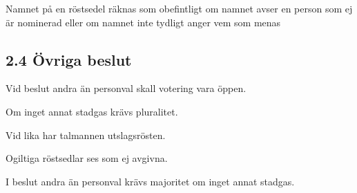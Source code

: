 \documentclass{dsekkallelse}
\begin{document}
Namnet på en röstsedel räknas som obefintligt om namnet avser en person som ej är nominerad
eller om namnet inte tydligt anger vem som menas

\subsection{2.4 Övriga beslut}
Vid beslut andra än personval skall votering vara öppen.

Om inget annat stadgas krävs pluralitet.

Vid lika har talmannen utslagsrösten.

Ogiltiga röstsedlar ses som ej avgivna.

I beslut andra än personval krävs majoritet om inget annat stadgas.
\end{document}
